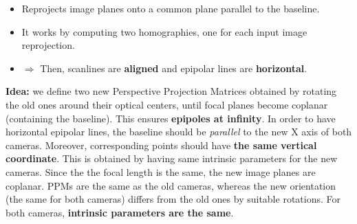 \documentclass[a4paper,12 pt]{article}
\theoremstyle{definition}
\theoremstyle{remark}
\theoremstyle{definition}
\theoremstyle{definition}
\theoremstyle{definition}
\theoremstyle{remark}
\theoremstyle{definition}
\begin{document}
\begin{itemize}
\item Reprojects image planes onto a common plane parallel to the baseline.
\item It works by computing two homographies, one for each input image reprojection.
\item $\Rightarrow$ Then, scanlines are \textbf{aligned} and epipolar lines are \textbf{horizontal}.
\end{itemize}
\textbf{Idea:} we define two new Perspective Projection Matrices obtained by rotating the old ones around their optical centers, until focal planes become coplanar (containing the baseline). This ensures \textbf{epipoles at infinity}. In order to have horizontal epipolar lines, the baseline should be \textit{parallel} to the new X axis of both cameras. Moreover, corresponding points should have \textbf{the same vertical coordinate}. This is obtained by having same intrinsic parameters for the new cameras. Since the the focal length is the same, the new image planes are coplanar. PPMs are the same as the old cameras, whereas the new orientation (the same for both cameras) differs from the old ones by suitable rotations. For both cameras, \textbf{intrinsic parameters are the same}.
\end{document}
